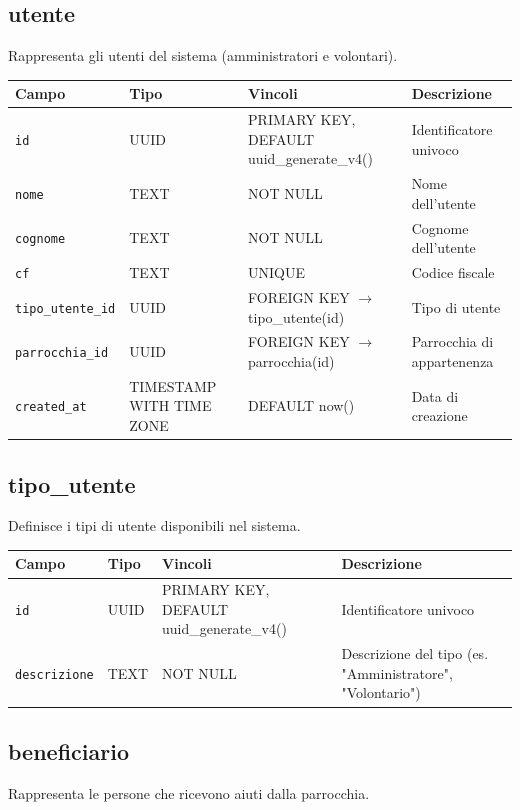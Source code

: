 \documentclass[11pt,a4paper]{article}
\begin{document}
\subsection{utente}
Rappresenta gli utenti del sistema (amministratori e volontari).

\begin{longtable}{p{3cm}p{3cm}p{4cm}p{5cm}}
\toprule
\textbf{Campo} & \textbf{Tipo} & \textbf{Vincoli} & \textbf{Descrizione} \\
\midrule
\texttt{id} & UUID & PRIMARY KEY, DEFAULT uuid\_generate\_v4() & Identificatore univoco \\
\texttt{nome} & TEXT & NOT NULL & Nome dell'utente \\
\texttt{cognome} & TEXT & NOT NULL & Cognome dell'utente \\
\texttt{cf} & TEXT & UNIQUE & Codice fiscale \\
\texttt{tipo\_utente\_id} & UUID & FOREIGN KEY $\rightarrow$ tipo\_utente(id) & Tipo di utente \\
\texttt{parrocchia\_id} & UUID & FOREIGN KEY $\rightarrow$ parrocchia(id) & Parrocchia di appartenenza \\
\texttt{created\_at} & TIMESTAMP WITH TIME ZONE & DEFAULT now() & Data di creazione \\
\end{longtable}

\subsection{tipo\_utente}
Definisce i tipi di utente disponibili nel sistema.

\begin{longtable}{p{3cm}p{3cm}p{4cm}p{5cm}}
\toprule
\textbf{Campo} & \textbf{Tipo} & \textbf{Vincoli} & \textbf{Descrizione} \\
\midrule
\texttt{id} & UUID & PRIMARY KEY, DEFAULT uuid\_generate\_v4() & Identificatore univoco \\
\texttt{descrizione} & TEXT & NOT NULL & Descrizione del tipo (es. "Amministratore", "Volontario") \\
\end{longtable}

\subsection{beneficiario}
Rappresenta le persone che ricevono aiuti dalla parrocchia.
\end{document}
